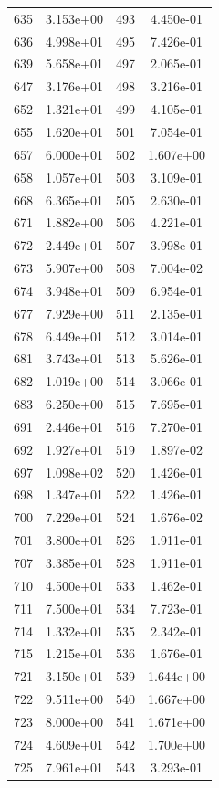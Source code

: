 \documentclass[12pt]{article}
\begin{document}
\begin{longtable}{@{}cccc@{}}
635 & 3.153e+00 & 493 & 4.450e-01 \\
636 & 4.998e+01 & 495 & 7.426e-01 \\
639 & 5.658e+01 & 497 & 2.065e-01 \\
647 & 3.176e+01 & 498 & 3.216e-01 \\
652 & 1.321e+01 & 499 & 4.105e-01 \\
655 & 1.620e+01 & 501 & 7.054e-01 \\
657 & 6.000e+01 & 502 & 1.607e+00 \\
658 & 1.057e+01 & 503 & 3.109e-01 \\
668 & 6.365e+01 & 505 & 2.630e-01 \\
671 & 1.882e+00 & 506 & 4.221e-01 \\
672 & 2.449e+01 & 507 & 3.998e-01 \\
673 & 5.907e+00 & 508 & 7.004e-02 \\
674 & 3.948e+01 & 509 & 6.954e-01 \\
677 & 7.929e+00 & 511 & 2.135e-01 \\
678 & 6.449e+01 & 512 & 3.014e-01 \\
681 & 3.743e+01 & 513 & 5.626e-01 \\
682 & 1.019e+00 & 514 & 3.066e-01 \\
683 & 6.250e+00 & 515 & 7.695e-01 \\
691 & 2.446e+01 & 516 & 7.270e-01 \\
692 & 1.927e+01 & 519 & 1.897e-02 \\
697 & 1.098e+02 & 520 & 1.426e-01 \\
698 & 1.347e+01 & 522 & 1.426e-01 \\
700 & 7.229e+01 & 524 & 1.676e-02 \\
701 & 3.800e+01 & 526 & 1.911e-01 \\
707 & 3.385e+01 & 528 & 1.911e-01 \\
710 & 4.500e+01 & 533 & 1.462e-01 \\
711 & 7.500e+01 & 534 & 7.723e-01 \\
714 & 1.332e+01 & 535 & 2.342e-01 \\
715 & 1.215e+01 & 536 & 1.676e-01 \\
721 & 3.150e+01 & 539 & 1.644e+00 \\
722 & 9.511e+00 & 540 & 1.667e+00 \\
723 & 8.000e+00 & 541 & 1.671e+00 \\
724 & 4.609e+01 & 542 & 1.700e+00 \\
725 & 7.961e+01 & 543 & 3.293e-01 \\

\end{longtable}
\end{document}

